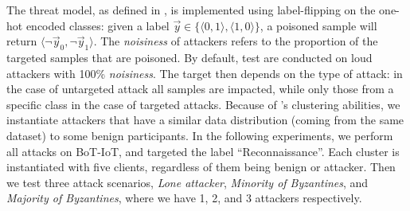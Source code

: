The threat model, as defined in , is implemented using label-flipping on the one-hot encoded classes: given a label $\Vec{y} \in \{\langle0,1\rangle,\langle1,0\rangle\}$, a poisoned sample will return $\langle \neg\Vec{y}_0, \neg\Vec{y}_1 \rangle$.
The \emph{noisiness} of attackers refers to the proportion of the targeted samples that are poisoned. 
By default, test are conducted on loud attackers with 100\% \emph{noisiness}. 
The target then depends on the type of attack: in the case of untargeted attack all samples are impacted, while only those from a specific class in the case of targeted attacks. 
Because of \thecontrib's clustering abilities, we instantiate attackers that have a similar data distribution (\ie coming from the same dataset) to some benign participants. 
In the following experiments, we perform all attacks on BoT-IoT, and targeted the label ``Reconnaissance''. 
Each cluster is instantiated with five clients, regardless of them being benign or attacker.
Then we test three attack scenarios, \emph{Lone attacker}, \emph{Minority of Byzantines}, and \emph{Majority of Byzantines}, where we have 1, 2, and 3 attackers respectively. 





%
 
